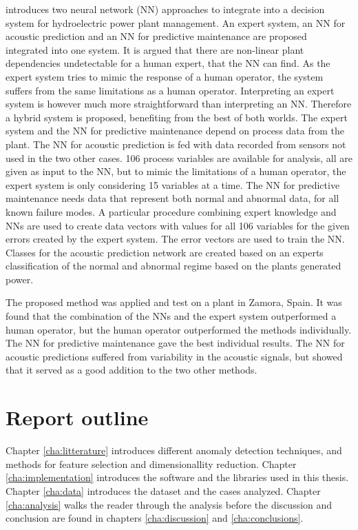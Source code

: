         \cite{Molina2000} introduces two neural network (NN) approaches to integrate into a decision system for hydroelectric power plant management. An expert system, an NN for acoustic prediction and an NN for predictive maintenance are proposed integrated into one system. It is argued that there are non-linear plant dependencies undetectable for a human expert, that the NN can find. As the expert system tries to mimic the response of a human operator, the system suffers from the same limitations as a human operator. Interpreting an expert system is however much more straightforward than interpreting an NN. Therefore a hybrid system is proposed, benefiting from the best of both worlds. The expert system and the NN for predictive maintenance depend on process data from the plant. The NN for acoustic prediction is fed with data recorded from sensors not used in the two other cases. 106 process variables are available for analysis, all are given as input to the NN, but to mimic the limitations of a human operator, the expert system is only considering 15 variables at a time. The NN for predictive maintenance needs data that represent both normal and abnormal data, for all known failure modes. A particular procedure combining expert knowledge and NNs are used to create data vectors with values for all 106 variables for the given errors created by the expert system. The error vectors are used to train the NN. Classes for the acoustic prediction network are created based on an experts classification of the normal and abnormal regime based on the plants generated power. 
        
        The proposed method was applied and test on a plant in Zamora, Spain. It was found that the combination of the NNs and the expert system outperformed a human operator, but the human operator outperformed the methods individually. The NN for predictive maintenance gave the best individual results. The NN for acoustic predictions suffered from variability in the acoustic signals, but showed that it served as a good addition to the two other methods. 
        
        
    
    
    
    \section{Report outline}
    Chapter \ref{cha:litterature} introduces different anomaly detection techniques, and methods for feature selection and dimensionallity reduction. Chapter \ref{cha:implementation} introduces the software and the libraries used in this thesis. Chapter \ref{cha:data} introduces the dataset and the cases analyzed. Chapter \ref{cha:analysis} walks the reader through the analysis before the discussion and conclusion are found in chapters  \ref{cha:discussion} and \ref{cha:conclusions}.  
